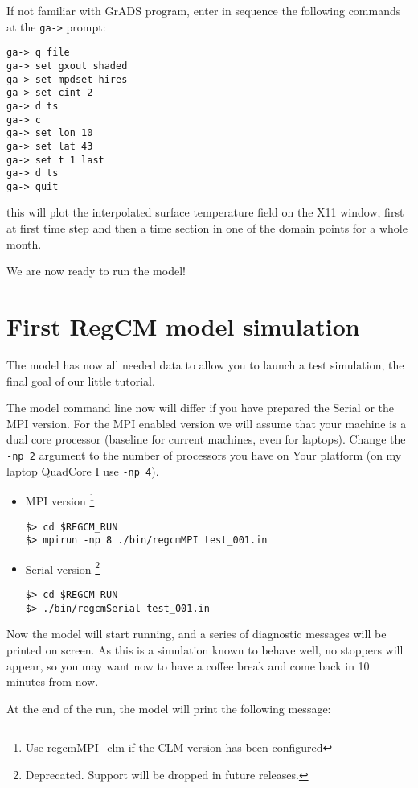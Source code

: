 If not familiar with GrADS program, enter in sequence the following commands at
the \verb=ga->= prompt:

\begin{Verbatim}
ga-> q file
ga-> set gxout shaded
ga-> set mpdset hires
ga-> set cint 2
ga-> d ts
ga-> c
ga-> set lon 10
ga-> set lat 43
ga-> set t 1 last
ga-> d ts
ga-> quit
\end{Verbatim}

this will plot the interpolated surface temperature field on the X11 window,
first at first time step and then a time section in one of the domain points
for a whole month.

We are now ready to run the model!

\section{First RegCM model simulation}

The model has now all needed data to allow you to launch a test simulation,
the final goal of our little tutorial.

The model command line now will differ if you have prepared the Serial or the
MPI version. For the MPI enabled version we will assume that your machine is
a dual core processor (baseline for current machines, even for laptops).
Change the \verb=-np 2= argument to the number of processors you have on
Your platform (on my laptop QuadCore I use \verb=-np 4=).

\begin{itemize}
\item MPI version \footnote{Use regcmMPI\_clm if the CLM version has been
  configured}
\begin{Verbatim}
$> cd $REGCM_RUN
$> mpirun -np 8 ./bin/regcmMPI test_001.in
\end{Verbatim}
\item Serial version \footnote{Deprecated. Support will be dropped in future
releases.}
\begin{Verbatim}
$> cd $REGCM_RUN
$> ./bin/regcmSerial test_001.in
\end{Verbatim}
\end{itemize}

Now the model will start running, and a series of diagnostic messages will be
printed on screen. As this is a simulation known to behave well, no stoppers
will appear, so you may want now to have a coffee break and come back in 10
minutes from now.

At the end of the run, the model will print the following message:

